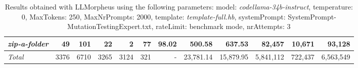 \begin{table*}
{\begin{tabular}{l||r|r|r|r|r|r|r||r|r||r|r}
   \hline
   \textit{zip-a-folder} & 49 & 101 & 22 & 2 & 77 & 98.02 & 500.58 & 637.53 & 82,457 & 10,671 & 93,128 \\ 
   \hline
   \textit{Total} & 3376 & 6710 & 3265 & 3124 & 321 & - & 23,781.14  & 15,879.95 & 5,841,112 & 722,437 & 6,563,549 \\ 
 \end{tabular}
 }
 \caption{Results obtained with LLMorpheus using the following parameters: 
   model: \textit{codellama-34b-instruct}, 
   temperature: 0, 
   MaxTokens: 250, 
   MaxNrPrompts: 2000, 
   template: \textit{template-full.hb}, 
   systemPrompt: SystemPrompt-MutationTestingExpert.txt, 
   rateLimit: benchmark mode, 
   nrAttempts: 3  
 }
\end{table*}

